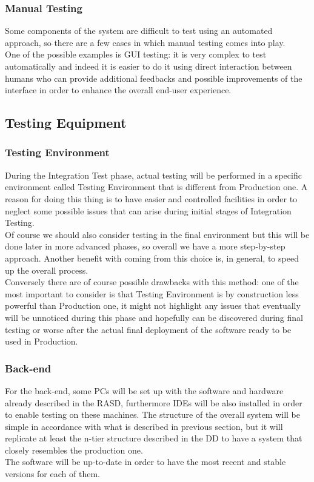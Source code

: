 \subsubsection{Manual Testing}
Some components of the system are difficult to test using an automated approach, so there are a few cases in which manual testing comes into play. \\ One of the possible examples is GUI testing: it is very complex to test automatically and indeed it is easier to do it using direct interaction between humans who can provide additional feedbacks and possible improvements of the interface in order to enhance the overall end-user experience. 

\subsection{Testing Equipment}

\subsubsection{Testing Environment}
During the Integration Test phase, actual testing will be performed in a specific environment called Testing Environment that is different from Production one. A reason for doing this thing is to have easier and controlled facilities in order to neglect some possible issues that can arise during initial stages of Integration Testing. \\ Of course we should also consider testing in the final environment but this will be done later in more advanced phases, so overall we have a more step-by-step approach. Another benefit with coming from this choice is, in general, to speed up the overall process. \\ Conversely there are of course possible drawbacks with this method: one of the most important to consider is that Testing Environment is by construction less powerful than Production one, it might not highlight any issues that eventually will be unnoticed during this phase and hopefully can be discovered during final testing or worse after the actual final deployment of the software ready to be used in Production.  

\subsubsection{Back-end}
For the back-end, some PCs will be set up with the software and hardware already described in the RASD, furthermore IDEs will be also installed in order to enable testing on these machines. The structure of the overall system will be simple in accordance with what is described in previous section, but it will replicate at least the n-tier structure described in the DD to have a system that closely resembles the production one. \\ The software will be up-to-date in order to have the most recent and stable versions for each of them.

